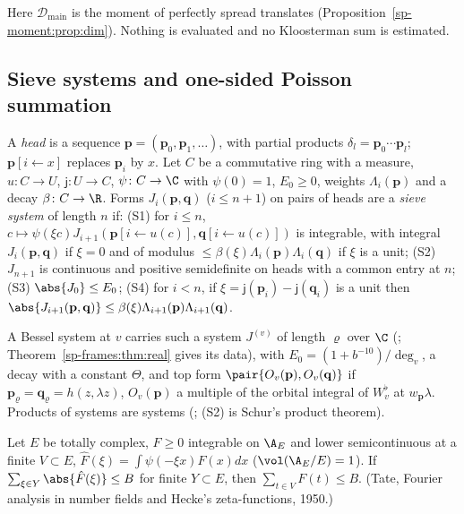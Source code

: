 Here $\mathcal D_{\mathrm{main}}$ is the moment of perfectly spread translates
(Proposition~\ref{sp-moment:prop:dim}). Nothing is evaluated and no Kloosterman sum is estimated.

\subsection{Sieve systems and one-sided Poisson summation}\label{sp-main:ss:sieve}

\begin{definition}\label{sp-main:def:sieve}
A \emph{head} is a sequence $\mathbf p=(\mathbf p_0,\mathbf p_1,\dots)$, with partial products
$\delta_l=\mathbf p_0\cdots\mathbf p_l$; $\mathbf p[i\leftarrow x]$ replaces $\mathbf p_i$ by $x$. Let $C$ be a commutative ring with a measure, $u\colon C\to U$, $\mathsf j\colon U\to C$, $\psi\colon
C\to\C$ with $\psi(0)=1$, $E_0\ge0$, weights $\Lambda_i(\mathbf p)$ and a decay $\beta\colon C\to\R$.
Forms $J_i(\mathbf p,\mathbf q)$ ($i\le n+1$) on pairs of heads are a \emph{sieve system} of length $n$
if: (S1) for $i\le n$, $c\mapsto\psi(\xi c)J_{i+1}(\mathbf p[i\leftarrow u(c)],\mathbf q[i\leftarrow
u(c)])$ is integrable, with integral $J_i(\mathbf p,\mathbf q)$ if $\xi=0$ and of modulus
$\le\beta(\xi)\Lambda_i(\mathbf p)\Lambda_i(\mathbf q)$ if $\xi$ is a unit; (S2) $J_{n+1}$ is continuous
and positive semidefinite on heads with a common entry at $n$; (S3) $\abs{J_0}\le E_0$; (S4) for $i<n$,
if $\xi=\mathsf j(\mathbf p_i)-\mathsf j(\mathbf q_i)$ is a unit then $\abs{J_{i+1}(\mathbf p,\mathbf q)}\le
\beta(\xi)\Lambda_{i+1}(\mathbf p)\Lambda_{i+1}(\mathbf q)$.
\end{definition}

A Bessel system at $v$ carries such a system $J^{(v)}$ of length $\varrho$ over $\C$
(; Theorem~\ref{sp-frames:thm:real} gives its data), with
$E_0=(1+b^{-10})/\deg_v$, a decay with a constant $\Theta$, and top form
$\pair{O_v(\mathbf p),O_v(\mathbf q)}$ if $\mathbf p_\varrho=\mathbf q_\varrho=h(z,\lambda z)$,
$O_v(\mathbf p)$ a multiple of the orbital integral of $W_v^\flat$ at $w_{\mathbf p}\lambda$. Products of systems are systems
(; (S2) is Schur's product theorem).

\begin{fact}
\label{sp-main:fact:poisson}
Let $E$ be totally complex, $F\ge0$ integrable on $\A_E$ and lower semicontinuous at a
finite $V\subset E$, $\hat F(\xi)=\int\psi(-\xi x)F(x)dx$ ($\vol(\A_E/E)=1$). If
$\sum_{\xi\in Y}\abs{\hat F(\xi)}\le B$ for finite $Y\subset E$, then $\sum_{t\in V}F(t)\le B$.
(Tate, Fourier analysis in number fields and Hecke's zeta-functions, 1950.)
\end{fact}

